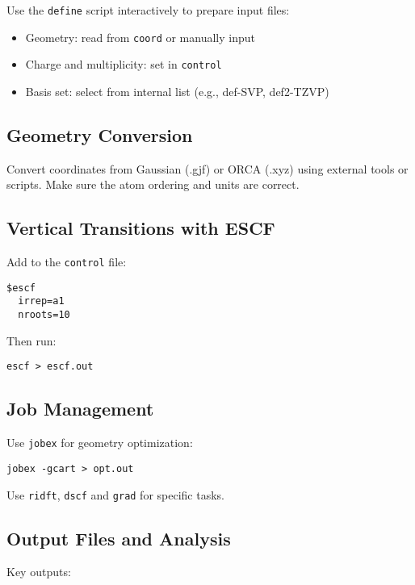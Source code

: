 Use the \texttt{define} script interactively to prepare input files:

\begin{itemize}
  \item Geometry: read from \texttt{coord} or manually input
  \item Charge and multiplicity: set in \texttt{control}
  \item Basis set: select from internal list (e.g., def-SVP, def2-TZVP)
\end{itemize}

\subsection*{Geometry Conversion}

Convert coordinates from Gaussian (.gjf) or ORCA (.xyz) using external tools or scripts. Make sure the atom ordering and units are correct.

\subsection*{Vertical Transitions with ESCF}

Add to the \texttt{control} file:

\begin{verbatim}
$escf
  irrep=a1
  nroots=10
\end{verbatim}

Then run:

\begin{verbatim}
escf > escf.out
\end{verbatim}

\subsection*{Job Management}

Use \texttt{jobex} for geometry optimization:

\begin{verbatim}
jobex -gcart > opt.out
\end{verbatim}

Use \texttt{ridft}, \texttt{dscf} and \texttt{grad} for specific tasks.

\subsection*{Output Files and Analysis}

Key outputs:

